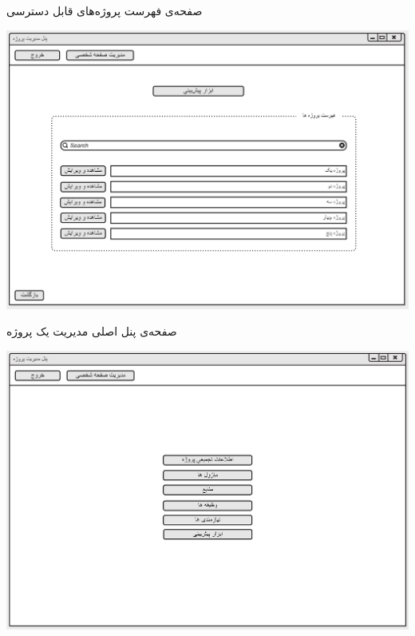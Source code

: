 \vspace{1cm}
صفحه‌ی فهرست پروژه‌های قابل دسترسی
\begin{center}
\includegraphics[width=\textwidth]{Prototype/ProjectManager/ProjectsList.png}
\end{center}

\newpage
\vspace{1cm}
صفحه‌ی پنل اصلی مدیریت یک پروژه
\begin{center}
\includegraphics[width=\textwidth]{Prototype/ProjectManager/ProjectManagementMainPanel.png}
\end{center}

